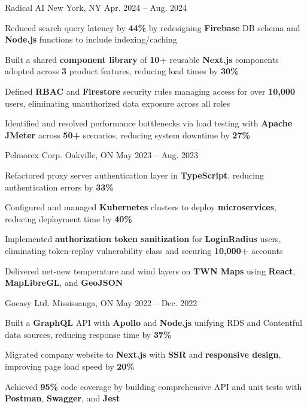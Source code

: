 \documentclass[11pt, a4paper]{awesome-cv}
\begin{document}
\begin{cventries}
  \cventry
    {\color{lightblue}{SOFTWARE ENGINEER INTERN}}
    {Radical AI}
    {New York, NY}
    {Apr. 2024 -- Aug. 2024}
    {
      \begin{cvitems}
        \item{Reduced search query latency by \textbf{44\%} by redesigning \textbf{Firebase} DB schema and \textbf{Node.js} functions to include indexing/caching}
        \item{Built a shared \textbf{component library} of \textbf{10+} reusable \textbf{Next.js} components adopted across \textbf{3} product features, reducing load times by \textbf{30\%}}
        \item{Defined \textbf{RBAC} and \textbf{Firestore} security rules managing access for over \textbf{10,000} users, eliminating unauthorized data exposure across all roles}
        \item{Identified and resolved performance bottlenecks via load testing with \textbf{Apache JMeter} across \textbf{50+} scenarios, reducing system downtime by \textbf{27\%}}
      \end{cvitems}
    }

  \cventry
    {\color{lightblue}{SOFTWARE ENGINEER INTERN}}
    {Pelmorex Corp.}
    {Oakville, ON}
    {May 2023 -- Aug. 2023}
    {
      \begin{cvitems}
        \item{Refactored proxy server authentication layer in \textbf{TypeScript}, reducing authentication errors by \textbf{33\%}}
        \item{Configured and managed \textbf{Kubernetes} clusters to deploy \textbf{microservices}, reducing deployment time by \textbf{40\%}}
        \item{Implemented \textbf{authorization token sanitization} for \textbf{LoginRadius} users, eliminating token-replay vulnerability class and securing \textbf{10,000+} accounts}
        \item{Delivered net-new temperature and wind layers on \textbf{TWN Maps} using \textbf{React}, \textbf{MapLibreGL}, and \textbf{GeoJSON}}
      \end{cvitems}
    }

  \cventry
    {\color{lightblue}{FRONT-END DEVELOPER INTERN}}
    {Goeasy Ltd.}
    {Mississauga, ON}
    {May 2022 -- Dec. 2022}
    {
      \begin{cvitems}
        \item{Built a \textbf{GraphQL} API with \textbf{Apollo} and \textbf{Node.js} unifying RDS and Contentful data sources, reducing response time by \textbf{37\%}}
        \item{Migrated company website to \textbf{Next.js} with \textbf{SSR} and \textbf{responsive design}, improving page load speed by \textbf{20\%}}
        \item{Achieved \textbf{95\%} code coverage by building comprehensive API and unit tests with \textbf{Postman}, \textbf{Swagger}, and \textbf{Jest}}
      \end{cvitems}
    }

\end{cventries}
\end{document}
